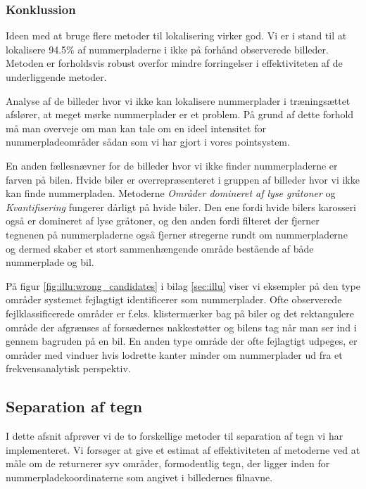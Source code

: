 \subsubsection{Konklussion}
Ideen med at bruge flere metoder til lokalisering virker god. Vi er i stand til at lokalisere 94.5\% af nummerpladerne i ikke på forhånd observerede billeder. Metoden er forholdsvis robust overfor mindre forringelser i effektiviteten af de underliggende metoder.

Analyse af de billeder hvor vi ikke kan lokalisere nummerplader i træningsættet afslører, at meget mørke nummerplader er et problem. På grund af dette forhold må man overveje om man kan tale om en ideel intensitet for nummerpladeområder sådan som vi har gjort i vores pointsystem.

En anden fællesnævner for de billeder hvor vi ikke finder nummerpladerne er farven på bilen. Hvide biler er overrepræsenteret i gruppen af billeder hvor vi ikke kan finde nummerpladen. Metoderne \textit{Områder domineret af lyse gråtoner} og \textit{Kvantifisering} fungerer dårligt på hvide biler. Den ene fordi hvide bilers karosseri også er domineret af lyse gråtoner, og den anden fordi filteret der fjerner tegnenen på nummerpladerne også fjerner stregerne rundt om nummerpladerne og dermed skaber et stort sammenhængende område bestående af både nummerplade og bil. 

På figur \vref{fig:illu:wrong_candidates} i bilag \ref{sec:illu} viser vi eksempler på den type områder systemet fejlagtigt identificerer som nummerplader. Ofte observerede fejlklassificerede områder er f.eks.  klistermærker bag på biler og det rektangulere område der afgrænses af forsædernes nakkestøtter og bilens tag når man ser ind i gennem bagruden på en bil. En anden type område der ofte fejlagtigt udpeges,  er områder med vinduer hvis lodrette kanter minder om nummerplader ud fra et frekvensanalytisk perspektiv.  



\subsection{Separation af tegn}
I dette afsnit afprøver vi de to forskellige metoder til separation af tegn vi har implementeret. Vi forsøger at give et estimat af effektiviteten af metoderne ved at måle om de returnerer syv områder, formodentlig tegn, der ligger inden for nummerpladekoordinaterne som angivet i billedernes filnavne. 

